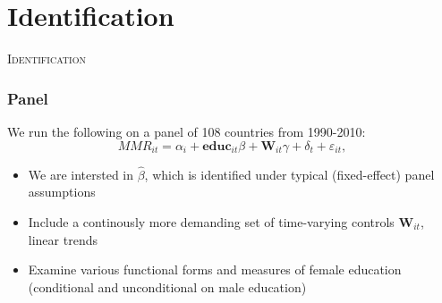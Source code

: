 \documentclass[10pt,letterpaper,subeqn, xcolor=table]{beamer}
\begin{document}

\section{Identification}
\begin{frame}
\begin{center}
\Large	
\textsc{\textcolor{dblue}{Identification}}
\end{center}
\end{frame}

\begin{frame}
\frametitle{Panel}
We run the following on a panel of 108 countries from 1990-2010:
\vspace{5mm}
\begin{equation}
\label{eqn:panel}
MMR_{it}=\alpha_i+\mathbf{educ}_{it}\beta + \mathbf{W}_{it}\gamma+\delta_t+\varepsilon_{it},
\end{equation}
\vspace{5mm}
\begin{itemize}
\item We are intersted in $\hat\beta$, which is identified under typical (fixed-effect) panel assumptions
\item Include a continously more demanding set of time-varying controls $\mathbf{W}_{it}$, linear trends
\item Examine various functional forms and measures of female education (conditional and unconditional on male education)
\end{itemize}
\end{frame}
\end{document}
